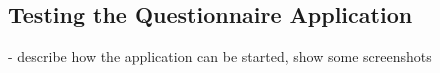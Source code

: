 \subsection{Testing the Questionnaire Application}

- describe how the application can be started, show some screenshots
